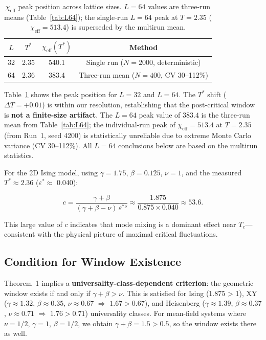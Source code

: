 \documentclass[aps,prl,twocolumn,superscriptaddress,byrevtex]{article}
\begin{document}
\begin{table}[t]
\centering
\caption{$\chi_{\text{eff}}$ peak position across lattice sizes. $L=64$ values are three-run means (Table~\ref{tab:L64}); the single-run $L=64$ peak at $T=2.35$ ($\chi_{\text{eff}}=513.4$) is superseded by the multirun mean.}
\label{tab:fss}
\begin{tabular}{cccc}
\toprule
$L$ & $T^*$ & $\chi_{\text{eff}}(T^*)$ & Method \\
\midrule
32  & 2.35 & 540.1 & Single run ($N=2000$, deterministic) \\
64  & 2.36 & 383.4 & Three-run mean ($N=400$, CV 30--112\%) \\
\bottomrule
\end{tabular}
\end{table}

Table~\ref{tab:fss} shows the peak position for $L=32$ and $L=64$. The $T^*$ shift ($\Delta T = +0.01$) is within our resolution, establishing that the post-critical window is \textbf{not a finite-size artifact}. The $L=64$ peak value of $383.4$ is the three-run mean from Table~\ref{tab:L64}; the individual-run peak of $\chi_{\text{eff}}=513.4$ at $T=2.35$ (from Run~1, seed 4200) is statistically unreliable due to extreme Monte Carlo variance (CV 30--112\%). All $L=64$ conclusions below are based on the multirun statistics.

For the 2D Ising model, using $\gamma = 1.75$, $\beta = 0.125$, $\nu = 1$, and the measured $T^* \approx 2.36$ ($\varepsilon^* \approx$ 0.040):

\begin{equation}
c = \frac{\gamma + \beta}{(\gamma + \beta - \nu)\,\varepsilon^{*\nu}} \approx \frac{1.875}{0.875 \times 0.040} \approx 53.6.
\label{eq:c_empirical}
\end{equation}

This large value of $c$ indicates that mode mixing is a dominant effect near $T_c$---consistent with the physical picture of maximal critical fluctuations.

\subsection{Condition for Window Existence}

Theorem~1 implies a \textbf{universality-class-dependent criterion}: the geometric window exists if and only if $\gamma + \beta > \nu$. This is satisfied for Ising (1.875 > 1), XY ($\gamma \approx 1.32$, $\beta \approx 0.35$, $\nu \approx 0.67$ $\Rightarrow$ $1.67 > 0.67$), and Heisenberg ($\gamma \approx 1.39$, $\beta \approx 0.37$, $\nu \approx 0.71$ $\Rightarrow$ $1.76 > 0.71$) universality classes. For mean-field systems where $\nu = 1/2$, $\gamma = 1$, $\beta = 1/2$, we obtain $\gamma + \beta = 1.5 > 0.5$, so the window exists there as well.
\end{document}
